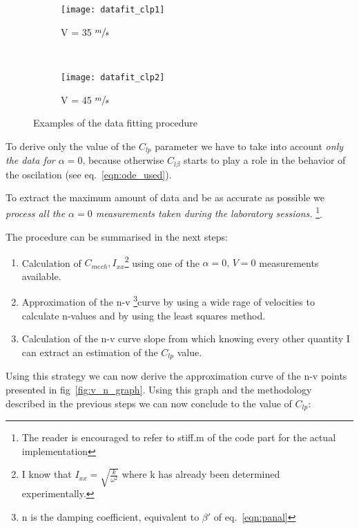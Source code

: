 \begin{figure}[H]
        \centering
        \begin{subfigure}[b]{0.48\textwidth}
                \texttt{[image: datafit\_clp1]}
                \caption{V = 35 $\sfrac{m}{s}$}
                \label{fig:datafit1}
        \end{subfigure}%
        ~
        \begin{subfigure}[b]{0.48\textwidth}
                \texttt{[image: datafit\_clp2]}
                \caption{V = 45 $\sfrac{m}{s}$}
                \label{fig:datafit2}
        \end{subfigure}

        \caption{Examples of the data fitting procedure}
\end{figure}

To derive only the value of the $C_{lp}$ parameter we have to take into account \textit{only the data for $\alpha = 0$},
because otherwise $C_{l\beta}$ starts to play a role in the behavior of the oscilation (see eq.~\ref{eqn:ode_used}).

To extract the maximum amount of data and be as accurate as possible we \textit{process all the $\alpha = 0$ measurements taken during the laboratory sessions.}
\footnote{The reader is encouraged to refer to stiff.m of the code part for the actual implementation}.

The procedure can be summarised in the next steps:
\begin{enumerate}
    \item Calculation of $C_{mech}, I_{xx}$\footnote{I know that $I_{xx} = \sqrt{\frac{k}{\omega^2}}$ where k
    has already been determined experimentally.} using one of the  $\alpha = 0,\, V = 0$ measurements available.
    \item Approximation of the n-v \footnote{n is the damping coefficient, equivalent to $\beta'$ of eq.~\ref{eqn:panal}}curve by using a wide rage of velocities to calculate n-values and by using the least squares method.
    \item Calculation of the n-v  curve slope from which knowing every other quantity I can extract an estimation of the $C_{lp}$ value.
\end{enumerate}

Using this strategy we can now derive the approximation curve of the n-v points
presented in fig~\ref{fig:v_n_graph}. Using this graph and the methodology described 
in the previous steps we can now conclude to the value of $C_{lp}$:

